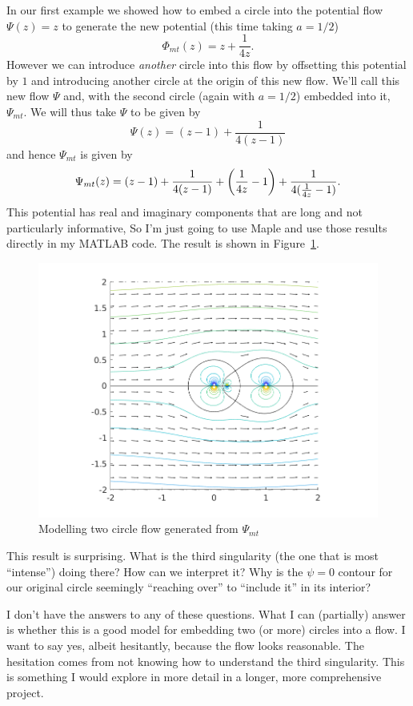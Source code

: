 \documentclass{article}
\begin{document}
In our first example we showed how to embed a circle into the potential
flow $\Psi(z) = z$ to generate the new potential (this time taking $a = 1/2$)
%
\begin{equation*}
    \Phi_{mt}(z) = z + \frac{1}{4 z}
    .
\end{equation*}
%
However we can introduce \textit{another} circle into this flow by
offsetting this potential by $1$ and introducing another circle at the
origin of this new flow. We'll call this new flow $\Psi$ and, with the
second circle (again with $a = 1/2$) embedded into it, $\Psi_{mt}$. We
will thus take $\Psi$ to be given by
%
\begin{equation*}
    \Psi(z) = (z - 1) + \frac{1}{4 (z - 1)}
\end{equation*}
%
and hence $\Psi_{mt}$ is given by
%
\begin{equation*}
    \Psi_{mt}(z)
        = (z - 1) + \frac{1}{4 (z - 1)}
        + \del{\frac{1}{4z} - 1} + \frac{1}{4 (\frac{1}{4z} - 1)}
        .
\end{equation*}
%
This potential has real and imaginary components that are long and not
particularly informative, So I'm just going to use Maple and use those
results directly in my MATLAB code. The result is shown in
Figure~\ref{fig:mt-6}.
%
\begin{figure}[ht]
    \includegraphics[width=35em]{mt_ex3_1}
    \centering
    \caption{Modelling two circle flow generated from $\Psi_{mt}$}
    \label{fig:mt-6}
\end{figure}
%
This result is surprising. What is the third singularity (the one that is
most ``intense'') doing there? How can we interpret it? Why is the $\psi
= 0$ contour for our original circle seemingly ``reaching over'' to
``include it'' in its interior?

I don't have the answers to any of these questions. What I can
(partially) answer is whether this is a good model for embedding two (or
more) circles into a flow. I want to say yes, albeit hesitantly, because
the flow looks reasonable. The hesitation comes from not knowing how to
understand the third singularity. This is something I would explore in
more detail in a longer, more comprehensive project.
\end{document}
